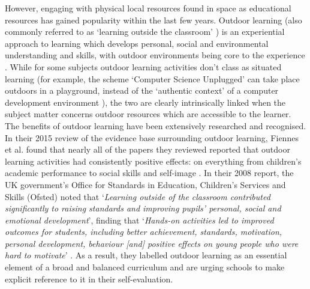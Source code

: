 However, engaging with physical local resources found in space as educational resources has gained popularity within the last few years. Outdoor learning (also commonly referred to as ‘learning outside the classroom’ \citep{Lotc.org2006}) is an experiential approach to learning which develops personal, social and environmental understanding and skills, with outdoor environments being core to the experience \citep{Harvey2012}. While for some subjects outdoor learning activities don't class as situated learning (for example, the scheme  `Computer Science Unplugged' can take place outdoors in a playground, instead of the `authentic context' of a computer development environment \citep{Bell2009}), the two are clearly intrinsically linked when the subject matter concerns outdoor resources which are accessible to the learner. The benefits of outdoor learning have been extensively researched and recognised. In their 2015 review of the evidence base surrounding outdoor learning, Fiennes et al. found that nearly all of the papers they reviewed reported that outdoor learning activities had consistently positive effects: on everything from children's academic performance to social skills and self-image \citep{Fiennes2015}. In their 2008 report, the UK government's Office for Standards in Education, Children's Services and Skills (Ofsted) noted that `\textit{Learning outside of the classroom contributed significantly to raising standards and improving pupils’ personal, social and emotional development}', finding that `\textit{Hands-on activities led to improved outcomes for students, including better achievement, standards, motivation, personal development, behaviour [and] positive effects on young people who were hard to motivate}' \citep{Ofsted2008}. As a result, they labelled outdoor learning as an essential element of a broad and balanced curriculum and are urging schools to make explicit reference to it in their self-evaluation.

